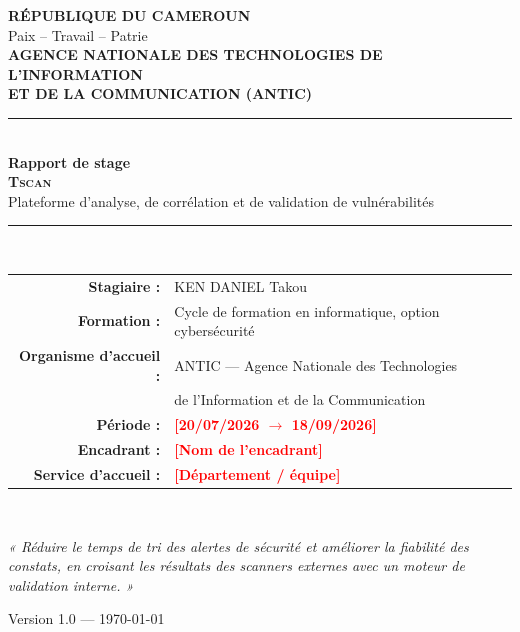 \documentclass[11pt,a4paper]{report}
\newcommand{\todo}[1]{\textcolor{red}{\textbf{[#1]}}}
\begin{document}
\begin{titlepage}
\begin{center}

{\Large \textbf{RÉPUBLIQUE DU CAMEROUN}}\\
{\small Paix -- Travail -- Patrie}\\[0.3cm]
{\normalsize \textbf{AGENCE NATIONALE DES TECHNOLOGIES DE L'INFORMATION\\ ET DE LA COMMUNICATION (ANTIC)}}\\[1.2cm]

\rule{\textwidth}{1.5pt}\\[0.4cm]
{\Huge \bfseries Rapport de stage}\\[0.6cm]
{\LARGE \bfseries \textsc{Tscan}}\\[0.5cm]
{\large Plateforme d'analyse, de corrélation et de validation de vulnérabilités}\\[0.4cm]
\rule{\textwidth}{1.5pt}\\[1.5cm]

\begin{tabular}{rl}
  \textbf{Stagiaire :} & KEN DANIEL Takou \\[0.2cm]
  \textbf{Formation :} & Cycle de formation en informatique, option cybersécurité \\[0.2cm]
  \textbf{Organisme d'accueil :} & ANTIC --- Agence Nationale des Technologies \\ 
   & de l'Information et de la Communication \\[0.2cm]
  \textbf{Période :} & \todo{20/07/2026 $\rightarrow$ 18/09/2026} \\[0.2cm]
  \textbf{Encadrant :} & \todo{Nom de l'encadrant} \\[0.2cm]
  \textbf{Service d'accueil :} & \todo{Département / équipe} \\
\end{tabular}\\[1.5cm]

\begin{tcolorbox}[colback=anticblue!4!white, colframe=anticblue, width=0.85\textwidth]
\centering \textit{« Réduire le temps de tri des alertes de sécurité et améliorer la fiabilité des constats, en croisant les résultats des scanners externes avec un moteur de validation interne. »}
\end{tcolorbox}

\vfill
{\large Version 1.0 --- \today}
\end{center}
\end{titlepage}
\end{document}
